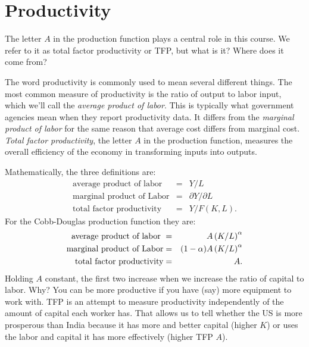\section{Productivity}

The letter $A$ in the production function plays a central role
in this course. We refer to it as total factor productivity 
 or TFP,
but what is it?  Where does it come from?


The word productivity is commonly used to mean several different
things. The most common measure of productivity is the ratio of
output to labor input, which we'll call the {\it average product
of labor\/}.  This is typically what government agencies mean when
they report productivity data.  It differs from the {\it marginal
product of labor\/} for the same reason that average cost differs
from marginal cost. {\it Total factor productivity\/},
the letter $A$ in the production function, measures the overall
efficiency of the economy in transforming inputs into outputs.

Mathematically, the three definitions are:
\begin{eqnarray*}
    \mbox{average product of labor} &=& {Y}/{ L} \\
    \mbox{marginal product of Labor} &=& {\partial Y}/{\partial L}\\
    \mbox{total factor productivity} &=& {Y}/{ F(K,L)} .
\end{eqnarray*}
For the Cobb-Douglas   production function they are:
\begin{eqnarray*}
    \mbox{average product of labor
} &=& A \left({K}/{L}\right)^\alpha  \\
    \mbox{marginal product \index{capital!marginal product of|(textbf} of Labor} &=& (1-\alpha) A \left({K}/{L}\right)^\alpha \\
    \mbox{total factor productivity} &=& A  .
\end{eqnarray*}
Holding $A$ constant,
the first two increase when we increase the ratio of capital to labor.
Why?
You can be more productive if you have
(say) more equipment to work with.
TFP is an attempt to measure productivity independently
of the amount of capital each worker has.
That allows us to tell whether the US is more prosperous
than India because it has more and better capital (higher $K$)
or uses the labor and capital it has more effectively (higher TFP $A$).


